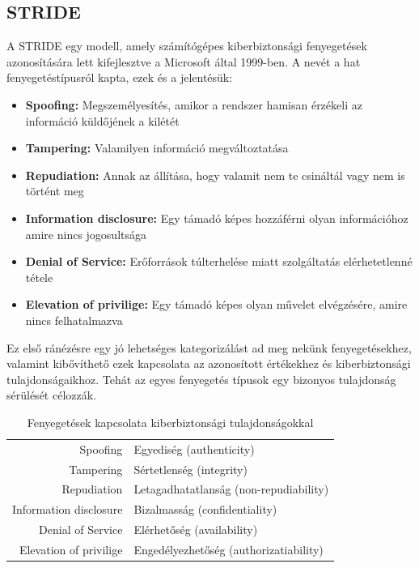 \subsection{STRIDE}
A STRIDE egy modell, amely számítógépes kiberbiztonsági fenyegetések azonosítására lett kifejlesztve a Microsoft által 1999-ben. A nevét a hat fenyegetéstípusról kapta, ezek és a jelentésük:

\begin{itemize}
    \item \textbf{Spoofing:} Megszemélyesítés, amikor a rendszer hamisan érzékeli az információ küldőjének a kilétét
    \item \textbf{Tampering:} Valamilyen információ megváltoztatása
    \item \textbf{Repudiation:} Annak az állítása, hogy valamit nem te csináltál vagy nem is történt meg
    \item \textbf{Information disclosure:} Egy támadó képes hozzáférni olyan információhoz amire nincs jogosultsága
    \item \textbf{Denial of Service:} Erőforrások túlterhelése miatt szolgáltatás elérhetetlenné tétele
    \item \textbf{Elevation of privilige:} Egy támadó képes olyan művelet elvégzésére, amire nincs felhatalmazva
\end{itemize}

Ez első ránézésre egy jó lehetséges kategorizálást ad meg nekünk fenyegetésekhez, valamint kibővíthető ezek kapcsolata az azonosított értékekhez és kiberbiztonsági tulajdonságaikhoz. Tehát az egyes fenyegetés típusok egy bizonyos tulajdonság sérülését célozzák.

\begin{table}[h]
    \centering
    \begin{tabular}{rl}
        Spoofing & Egyediség (authenticity) \\
        Tampering & Sértetlenség (integrity) \\
        Repudiation & Letagadhatatlanság (non-repudiability) \\
        Information disclosure & Bizalmasság (confidentiality) \\
        Denial of Service & Elérhetőség (availability) \\
        Elevation of privilige & Engedélyezhetőség (authorizatiability) \\
    \end{tabular}
    \caption{Fenyegetések kapcsolata kiberbiztonsági tulajdonságokkal}
    \label{tab:my_label}
\end{table}

